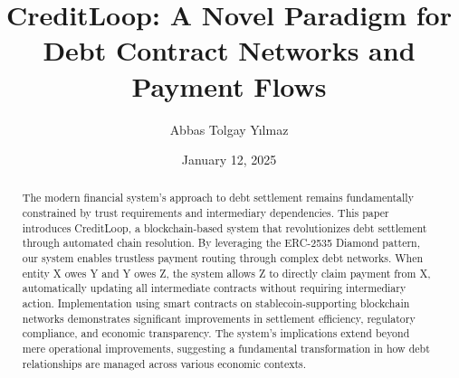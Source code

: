 \documentclass[twocolumn,10pt,a4paper]{article}
\title{\Large CreditLoop: A Novel Paradigm for Debt Contract Networks and Payment Flows}
\author[1]{Abbas Tolgay Yılmaz}
\affil[1]{Start a World Peace Technology A.S. \\ \texttt{tolgay@stateful.art}}
\date{January 12, 2025}
\begin{document}
\maketitle
\thispagestyle{empty}

\begin{abstract}
The modern financial system's approach to debt settlement remains fundamentally constrained by trust requirements and intermediary dependencies. This paper introduces CreditLoop, a blockchain-based system that revolutionizes debt settlement through automated chain resolution. By leveraging the ERC-2535 Diamond pattern, our system enables trustless payment routing through complex debt networks. When entity X owes Y and Y owes Z, the system allows Z to directly claim payment from X, automatically updating all intermediate contracts without requiring intermediary action. Implementation using smart contracts on stablecoin-supporting blockchain networks demonstrates significant improvements in settlement efficiency, regulatory compliance, and economic transparency. The system's implications extend beyond mere operational improvements, suggesting a fundamental transformation in how debt relationships are managed across various economic contexts.
\end{abstract}
\end{document}
